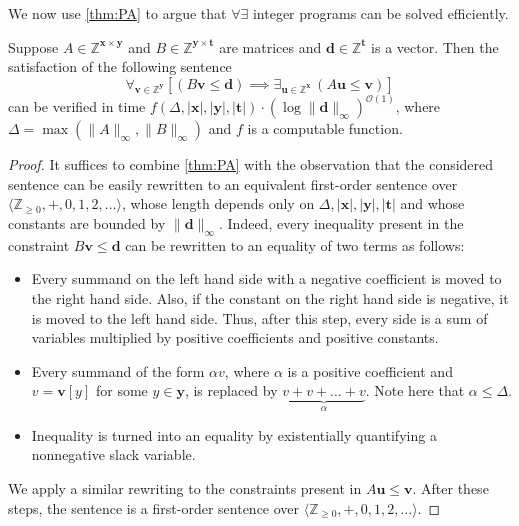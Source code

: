 \documentclass{article}
\renewcommand{\leq}{\leqslant}
\renewcommand{\geq}{\geqslant}
\newcommand{\Z}{\mathbb{Z}}
\newcommand{\Zn}{\Z_{\geq 0}}
\newcommand{\tup}[1]{{\mathbf{#1}}}
\newcommand{\xx}{\tup x}
\newcommand{\yy}{\tup y}
\newcommand{\tv}{\tup t}
\newcommand{\dd}{\tup d}
\newcommand{\uu}{\tup u}
\newcommand{\myvv}{\tup v} %
\newcommand{\matrices}[3]{#1^{#2\times #3}}
\newcommand{\Oh}{{\mathcal{O}}}
\begin{document}

We now use \cref{thm:PA} to argue that $\forall\exists$ integer programs can be solved efficiently.

\begin{lemma}\label{thm:EisenbrandShmonin}
Suppose $A\in \matrices{\Z}{\xx}{\yy}$ and $B\in \matrices{\Z}{\yy}{\tv}$ are matrices and $\dd\in \Z^\tv$ is a vector. Then the satisfaction of the following sentence
$$\forall_{\myvv\in \Z^\yy} \left[(B\myvv\leq \dd) \implies \exists_{\uu\in \Z^\xx}\, (A\uu\leq \myvv)\right]$$
can be verified in time $f(\Delta,|\xx|,|\yy|,|\tv|)\cdot \left(\log \|\dd\|_\infty\right)^{\Oh(1)}$, where $\Delta=\max(\|A\|_\infty,\|B\|_\infty)$ and $f$ is a computable function.
\end{lemma}
\begin{proof}
    It suffices to combine \cref{thm:PA} with the observation that the considered sentence can be easily rewritten to an equivalent first-order sentence over $\langle \Zn,+,0,1,2,\ldots \rangle$, whose length depends only on $\Delta,|\xx|,|\yy|,|\tv|$ and whose constants are bounded by $\|\dd\|_\infty$. Indeed, every inequality present in the constraint $B\myvv\leq \dd$ can be rewritten to an equality of two terms as follows:
    \begin{itemize}[nosep]
    \item Every summand on the left hand side with a negative coefficient is moved to the right hand side. Also, if the constant on the right hand side is negative, it is moved to the left hand side. Thus, after this step, every side is a sum of variables multiplied by positive coefficients and positive constants.
    \item Every summand of the form $\alpha v$, where $\alpha$ is a positive coefficient and $v=\myvv[y]$ for some $y\in \yy$, is replaced by $\underbrace{v+v+\ldots+v}_\alpha$. Note here that $\alpha\leq \Delta$.
    \item Inequality is turned into an equality by existentially quantifying a nonnegative slack variable.
    \end{itemize}
    We apply a similar rewriting to the constraints present in $A\uu\leq \myvv$. After these steps, the sentence is a first-order sentence over $\langle \Zn,+,0,1,2,\ldots \rangle$.
\end{proof}
\end{document}

